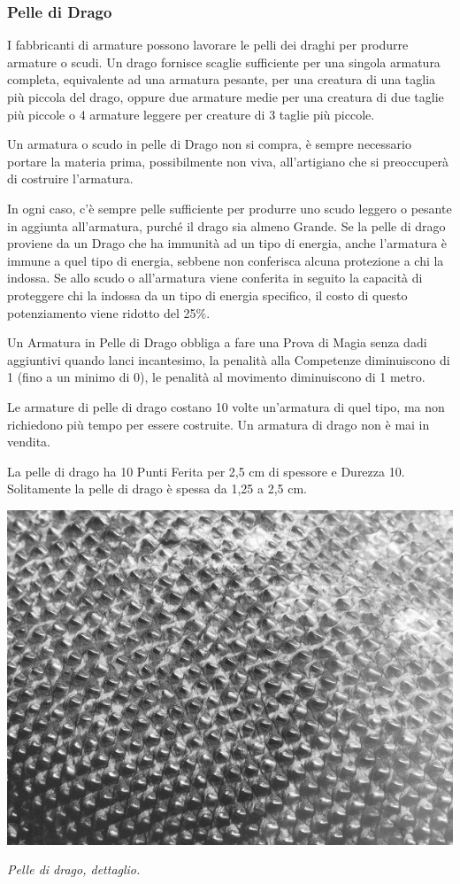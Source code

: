 \begin{multicols}{2}
\subsubsection{Pelle di Drago}

\label{pelle-di-drago}

I fabbricanti di armature possono lavorare le pelli dei draghi per produrre armature o scudi.
Un drago fornisce scaglie sufficiente per una singola armatura completa, equivalente ad una armatura pesante, per una creatura di una taglia più piccola del drago, oppure due armature medie per una creatura di due taglie più piccole o 4 armature leggere per creature di 3 taglie più piccole.

Un armatura o scudo in pelle di Drago non si compra, è sempre necessario portare la materia prima, possibilmente non viva, all'artigiano che si preoccuperà di costruire l'armatura.

In ogni caso, c'è sempre pelle sufficiente per produrre uno scudo leggero o pesante in aggiunta all'armatura, purché il drago sia almeno Grande.
Se la pelle di drago proviene da un Drago che ha immunità ad un tipo di energia, anche l'armatura è immune a quel tipo di energia, sebbene non conferisca alcuna protezione a chi la indossa. Se allo scudo o all'armatura viene conferita in seguito la capacità di proteggere chi la indossa da un tipo di energia specifico, il costo di questo potenziamento viene ridotto del 25\%.

Un Armatura in Pelle di Drago obbliga a fare una Prova di Magia senza dadi aggiuntivi quando lanci incantesimo, la penalità alla Competenze diminuiscono di 1 (fino a un minimo di 0), le penalità al movimento diminuiscono di 1 metro.

Le armature di pelle di drago costano 10 volte un'armatura di quel tipo, ma non richiedono più tempo per essere costruite. Un armatura di drago non è mai in vendita.

La pelle di drago ha 10 Punti Ferita per 2,5 cm di spessore e Durezza 10. Solitamente la pelle di drago è spessa da 1,25 a 2,5 cm.

\end{multicols}

\vfill

\begin{center}
\includegraphics[width=0.6\linewidth]{immagini/dragonhide.png}

\emph{Pelle di drago, dettaglio.}
\end{center}

\pagebreak

